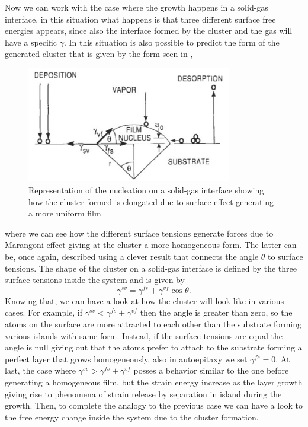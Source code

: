Now we can work with the case where the growth happens in a solid-gas interface, in this situation what happens is that three different surface free energies appears, since also the interface formed by the cluster and the gas will have a specific $\gamma$. In this situation is also possible to predict the form of the generated cluster that is given by the form seen in ,
\begin{figure}
    \centering
    \includegraphics[width=0.8\textwidth]{Immagini/SolidGasInterf.png}
    \caption{
        Representation of the nucleation on a solid-gas interface showing how the cluster formed is elongated due to surface effect generating a more uniform film.
    }
    \label{fig:SolidGasInterf}
\end{figure}
where we can see how the different surface tensions generate forces due to Marangoni effect giving at the cluster a more homogeneous form. The latter can be, once again, described using a clever result that connects the angle $\theta$ to surface tensions.
{
    The shape of the cluster on a solid-gas interface is defined by the three surface tensions inside the system and is given by
    \begin{equation}
        \gamma^{sv} = \gamma^{fs} + \gamma^{vf}\cos\theta.
    \end{equation}
}
\noindent
Knowing that, we can have a look at how the cluster will look like in various cases. For example, if $\gamma^{sv} < \gamma^{fs} + \gamma^{vf}$ then the angle is greater than zero, so the atoms on the surface are more attracted to each other than the substrate forming various islands with same form. Instead, if the surface tensions are equal the angle is null giving out that the atoms prefer to attach to the substrate forming a perfect layer that grows homogeneously, also in autoepitaxy we set $\gamma^{fs} = 0$. At last, the case where $\gamma^{sv} > \gamma^{fs} + \gamma^{vf}$ posses a behavior similar to the one before generating a homogeneous film, but the strain energy increase as the layer growth giving rise to phenomena of strain release by separation in island during the growth. Then, to complete the analogy to the previous case we can have a look to the free energy change inside the system due to the cluster formation.
